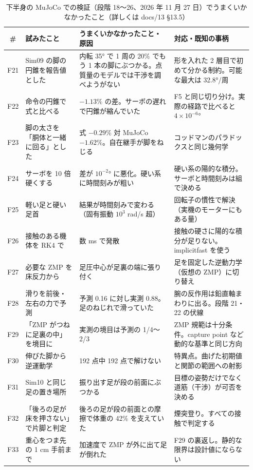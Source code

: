 \documentclass[paper=a4paper,fontsize=10pt,twocolumn,column_gap=2zw,line_length=24zw,number_of_lines=46,head_space=20mm]{jlreq}
\begin{document}
\begin{table}[t]\centering\footnotesize
\caption{下半身の MuJoCo での検証（段階 18〜26、2026 年 11 月 27 日）でうまくいかなかったこと（詳しくは docs/13 §13.5）}\label{tab:fail3}
\setlength{\tabcolsep}{3pt}
\begin{tabular}{cp{}p{}p{}}\toprule
\# & 試みたこと & うまくいかなかったこと・原因 & 対応・既知の事柄 \\\midrule
F21 & Sim09 の脚の円錐を報告値とした & 内転 35° で 1 周の 20\% でもう 1 本の脚にぶつかる。点質量のモデルでは干渉を調べようがない & 形を入れた 2 層目で初めて分かる制約。可能な最大は 32.8°/周 \\
F22 & 命令の円錐で式と比べる & $-1.13\%$ の差。サーボの遅れで円錐が縮んでいた & F5 と同じ切り分け。実際の経路で比べると $4\times10^{-6}$° \\
F23 & 脚の太さを「胴体と一緒に回る」とした & 式 $-0.29\%$ 対 MuJoCo $-1.62\%$。自在継手が脚をねじる & コッドマンのパラドックスと同じ幾何学 \\
F24 & サーボを 10 倍硬くする & 差が $10^{-2}$° に悪化。硬い系に時間刻みが粗い & 硬い系の陽的な積分。サーボと時間刻みは組で決める \\
F25 & 軽い足と硬い足首 & 結果が時間刻みで変わる（固有振動 $10^3$ rad/s 超） & 回転子の慣性で解決（実機のモーターにもある量） \\
F26 & 接触のある機体を RK4 で & 数 ms で発散 & 接触の硬さに陽的な積分が足りない。implicitfast を使う \\
F27 & 必要な ZMP を床反力から & 足圧中心が足裏の端に張り付く & 足を固定した逆動力学（仮想の ZMP）に切り替え \\
F28 & 滑りを前後・左右の力で予測 & 予測 0.16 に対し実測 0.88。足のねじれで滑っていた & 腕の反作用は鉛直軸まわりに出る。段階 21・22 の伏線 \\
F29 & 「ZMP がつねに足裏の中」を境目に & 実測の境目は予測の 1/4〜2/3 & ZMP 規範は十分条件。capture point など動的な基準と同じ方向 \\
F30 & 伸びた脚から逆運動学 & 192 点中 192 点で解けない & 特異点。曲げた初期値と関節の範囲への射影 \\
F31 & Sim10 と同じ足の置き場所 & 振り出す足が段の前面にぶつかる & 目標の姿勢だけでなく道筋（干渉）が可否を決める \\
F32 & 「後ろの足が床を押さない」で片脚と判定 & 後ろの足が段の前面との摩擦で体重の 42\% を支えていた & 煙突登り。すべての接触で判定する \\
F33 & 重心をつま先の 1 cm 手前まで & 加速度で ZMP が外に出て足が倒れた & F29 の裏返し。静的な限界は設計値にならない \\

\end{tabular}
\end{table}
\end{document}
